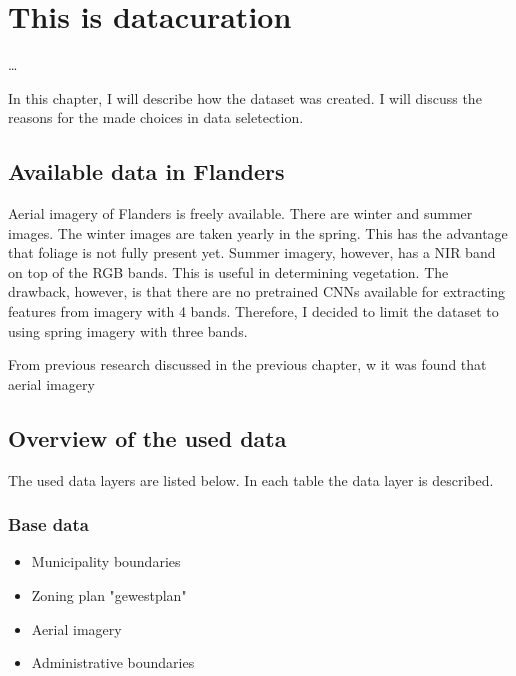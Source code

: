 \chapter{This is datacuration}\label{ch:datacuration}

\ldots

In this chapter, I will describe how the dataset was created. I will discuss the reasons for the made choices in data seletection.


\section{Available data in Flanders}
Aerial imagery of Flanders is freely available. There are winter and summer images. The winter images are taken yearly in the spring. This has the advantage that foliage is not fully present yet. Summer imagery, however, has a NIR band on top of the RGB bands. This is useful in determining vegetation. The drawback, however, is that there are no pretrained CNNs available for extracting features from imagery with 4 bands. Therefore, I decided to limit the dataset to using spring imagery with three bands.

From previous research discussed in the previous chapter, w it was found that aerial imagery 


\section{Overview of the used data}

The used data layers are listed below. In each table the data layer is described.
\subsection{Base data}

\begin{itemize}
    \item Municipality boundaries
    \item Zoning plan "gewestplan"
    \item Aerial imagery
    \item Administrative boundaries
\end{itemize}

